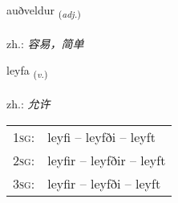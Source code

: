 \documentclass[frontgrid, backgrid]{flacards}\usepackage[]{graphicx}\usepackage[]{xcolor}
\begin{document}
\renewcommand{\flhead}{\vskip5pt \fboxsep=0pt {\small\bfseries\footnotesize Lýsingarorð | 形容词}}
\renewcommand{\fcfoot}{\vskip5pt \fboxsep=0pt \hspace{2pt}{\small\bfseries\footnotesize 1K}}

\renewcommand{\blhead}{\vskip5pt {\small\bfseries\footnotesize Lýsingarorð | 形容词 }}
\renewcommand{\bcfoot}{\vskip5pt \hspace{2pt}{\small\bfseries\footnotesize 1K}}


{auðveldur \small{\textsubscript{(\textit{adj.})}} \\[1ex] %
\textphonetic{[œiðvɛltʏr]} \\
zh.: \emph{容易，简单} \\  [2ex]
\renewcommand*{\arraystretch}{0.8}
}

\renewcommand{\flhead}{\vskip5pt \fboxsep=0pt {\small\bfseries\footnotesize Sagnorð | 动词}}
\renewcommand{\fcfoot}{\vskip5pt \fboxsep=0pt \hspace{2pt}{\small\bfseries\footnotesize 1K}}

\renewcommand{\blhead}{\vskip5pt {\small\bfseries\footnotesize Sagnorð | 动词 }}
\renewcommand{\bcfoot}{\vskip5pt \hspace{2pt}{\small\bfseries\footnotesize 1K}}


{leyfa \small{\textsubscript{(\textit{v.})}} \\[1ex] %
\textphonetic{[leiːva]} \\
zh.: \emph{允许} \\  [2ex]
\renewcommand*{\arraystretch}{0.8}
\begin{tabular}{p{1cm}l}
\textsc{1sg}: & leyfi -- leyfði -- leyft \\ 
\textsc{2sg}: & leyfir -- leyfðir -- leyft \\ 
\textsc{3sg}: & leyfir -- leyfði -- leyft \\ 
\end{tabular}
}
\end{document}
